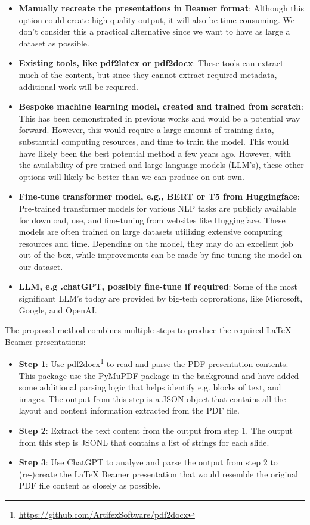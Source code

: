 \begin{itemize}
    \item \textbf{Manually recreate the presentations in Beamer format}: Although this option could create high-quality output, it will also be time-consuming. We don't consider this a practical alternative since we want to have as large a dataset as possible.
    \item \textbf{Existing tools, like pdf2latex or pdf2docx}: These tools can extract much of the content, but since they cannot extract required metadata, additional work will be required.
    \item \textbf{Bespoke machine learning model, created and trained from scratch}: This has been demonstrated in previous works and would be a potential way forward. However, this would require a large amount of training data, substantial computing resources, and time to train the model. This would have likely been the best potential method a few years ago. However, with the availability of pre-trained and large language models (LLM's), these other options will likely be better than we can produce on out own.
    \item \textbf{Fine-tune transformer model, e.g., BERT or T5 from Huggingface}: Pre-trained transformer models for various NLP tasks are publicly available for download, use, and fine-tuning from websites like Huggingface. These models are often trained on large datasets utilizing extensive computing resources and time. Depending on the model, they may do an excellent job out of the box, while improvements can be made by fine-tuning the model on our dataset.
    \item \textbf{LLM, e.g .chatGPT, possibly fine-tune if required}: Some of the most significant LLM's today are provided by big-tech coprorations, like Microsoft, Google, and OpenAI.
\end{itemize}

The proposed method combines multiple steps to produce the required \LaTeX{} Beamer presentations:
\begin{itemize}
    \item \textbf{Step 1}: Use pdf2docx\footnote{\url{https://github.com/ArtifexSoftware/pdf2docx}} to read and parse the PDF presentation contents. This package use the PyMuPDF package in the background and have added some additional parsing logic that helps identify e.g. blocks of text, and images. The output from this step is a JSON object that contains all the layout and content information extracted from the PDF file.
    \item \textbf{Step 2}: Extract the text content from the output from step 1. The output from this step is JSONL that contains a list of strings for each slide.
    \item \textbf{Step 3}: Use ChatGPT to analyze and parse the output from step 2 to (re-)create the \LaTeX{} Beamer presentation that would resemble the original PDF file content as closely as possible.
\end{itemize}

